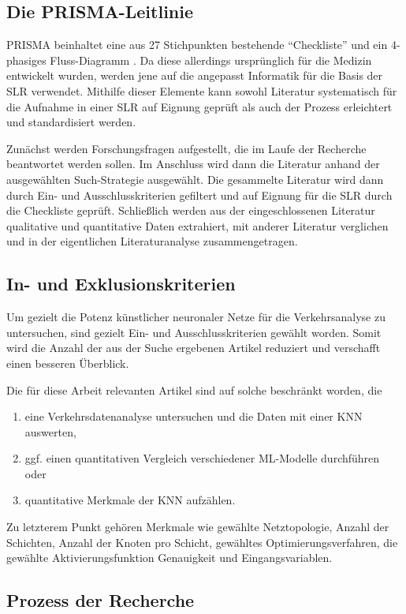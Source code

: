 \documentclass{scrartcl}
\begin{document}
\subsection{Die PRISMA-Leitlinie}
PRISMA beinhaltet eine aus 27 Stichpunkten bestehende \enquote{Checkliste}
und ein 4-phasiges Fluss-Diagramm \cite{prisma}. Da diese allerdings ursprünglich
für die Medizin entwickelt wurden, werden jene auf die angepasst Informatik
für die Basis der SLR verwendet.  Mithilfe dieser Elemente kann sowohl Literatur
systematisch für die Aufnahme in einer SLR auf Eignung geprüft als auch der
Prozess erleichtert und standardisiert werden.

Zunächst werden Forschungsfragen aufgestellt, die im Laufe der Recherche beantwortet
werden sollen. Im Anschluss wird dann die Literatur anhand der ausgewählten
Such-Strategie ausgewählt. Die gesammelte Literatur wird dann durch Ein- und
Ausschlusskriterien gefiltert und auf Eignung für die SLR durch die Checkliste geprüft.
Schließlich werden aus der eingeschlossenen Literatur qualitative und quantitative
Daten extrahiert, mit anderer Literatur verglichen und in der eigentlichen
Literaturanalyse zusammengetragen.

\subsection{In- und Exklusionskriterien}
Um gezielt die Potenz künstlicher neuronaler Netze für die Verkehrsanalyse zu
untersuchen, sind gezielt Ein- und Ausschlusskriterien gewählt worden. Somit
wird die Anzahl der aus der Suche ergebenen Artikel reduziert und verschafft
einen besseren Überblick.

Die für diese Arbeit relevanten Artikel sind auf solche beschränkt worden, die
\begin{enumerate}
   \item{eine Verkehrsdatenanalyse untersuchen und die Daten mit einer KNN auswerten,}
   \item{ggf. einen quantitativen Vergleich verschiedener ML-Modelle durchführen oder}
   \item{quantitative Merkmale der KNN aufzählen.}
\end{enumerate}
Zu letzterem Punkt gehören Merkmale wie gewählte Netztopologie, Anzahl der Schichten,
Anzahl der Knoten pro Schicht, gewähltes Optimierungsverfahren, die gewählte
Aktivierungsfunktion Genauigkeit und Eingangsvariablen.

\subsection{Prozess der Recherche}
\end{document}
